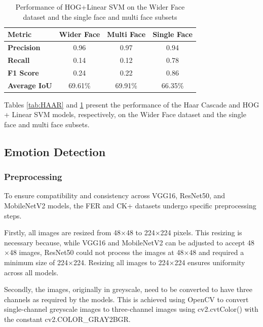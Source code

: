 \begin{table}[h!]
\centering{}
\caption{Performance of HOG+Linear SVM on the Wider Face dataset and the single face and multi face subsets}
\begin{tabular}{|l|c|c|c|}
\hline
\textbf{Metric}      & \textbf{Wider Face} & \textbf{Multi Face}  & \textbf{Single Face} \\ \hline
\textbf{Precision}   & 0.96       & 0.97           & 0.94               \\ \hline
\textbf{Recall}      & 0.14       & 0.12           & 0.78               \\ \hline
\textbf{F1 Score}    & 0.24       & 0.22           & 0.86               \\ \hline
\textbf{Average IoU} & 69.61\%      & 69.91\%           & 66.35\%              \\ \hline
\end{tabular}
\label{tab:HOGSVM}
\end{table}

Tables \ref{tab:HAAR} and \ref{tab:HOGSVM} present the performance of the Haar Cascade and HOG + Linear SVM models, respectively, on the Wider Face dataset and the single face and multi face subsets.

\subsection{Emotion Detection}

\subsubsection{Preprocessing}

To ensure compatibility and consistency across VGG16, ResNet50, and MobileNetV2 models, the FER and CK+ datasets undergo specific preprocessing steps.

Firstly, all images are resized from 48\(\times\)48 to 224\(\times\)224 pixels. This resizing is necessary because, while VGG16 and MobileNetV2 can be adjusted to accept 48\(\times\)48 images, ResNet50 could not process the images at 48\(\times\)48 and required a minimum size of 224\(\times\)224. Resizing all images to 224\(\times\)224 ensures uniformity across all models.

Secondly, the images, originally in greyscale, need to be converted to have three channels as required by the models. This is achieved using OpenCV to convert single-channel greyscale images to three-channel images using cv2.cvtColor() with the constant cv2.COLOR\_GRAY2BGR.

